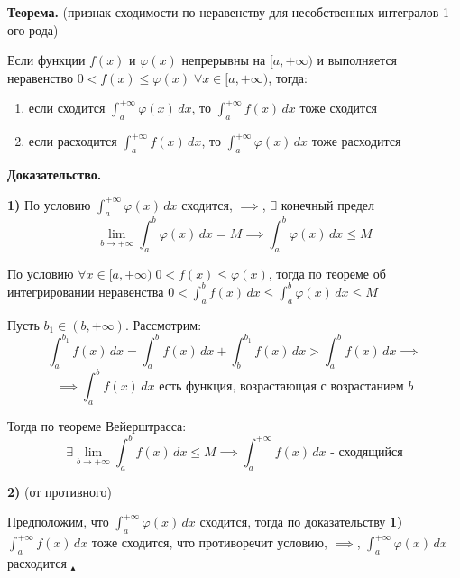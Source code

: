 \documentclass[11pt]{article}
\begin{document}
\par\textbf{Теорема.} (признак сходимости по неравенству для несобственных интегралов 1-ого рода)
\par Если функции $f(x)$ и $\varphi(x)$ непрерывны на $[a, +\infty)$ и выполняется неравенство $0 < f(x) \leq \varphi(x) \; \forall x \in [a, +\infty)$, тогда:
\begin{enumerate}
\item если сходится $\int_{a}^{+\infty} \varphi(x) \, dx$, то $\int_{a}^{+\infty} f(x) \, dx$ тоже сходится
\item если расходится $\int_{a}^{+\infty} f(x) \, dx$, то $\int_{a}^{+\infty} \varphi(x) \, dx$ тоже расходится
\end{enumerate}
\par\textbf{Доказательство.}
\par\textbf{1)} По условию $\int_{a}^{+\infty} \varphi(x) \, dx$ сходится, $\implies$, $\exists$ конечный предел $$\lim_{b \to +\infty}{\int_{a}^b \varphi(x) \, dx } = M \implies \int_{a}^{b} \varphi(x) \, dx \leq M$$
\par По условию $\forall x \in [a, +\infty) \; 0 < f(x) \leq \varphi(x)$, тогда по теореме об интегрировании неравенства  $0 < \int_{a}^b f(x) \, dx \leq \int_{a}^{b} \varphi(x) \, dx \leq M$
\par Пусть $b_{1} \in (b, +\infty)$. Рассмотрим:
$$\int_{a}^{b_{1}} f(x) \, dx = \int_{a}^{b} f(x) \, dx + \int_{b}^{b_{1}} f(x) \, dx > \int_{a}^{b} f(x) \, dx \implies$$
$$\implies \int_{a}^{b} f(x) \, dx \text{ есть функция, возрастающая с возрастанием } b$$
\par Тогда по теореме Вейерштрасса: $$\exists \lim_{ b \to +\infty } \int_{a}^{b} f(x) \, dx \leq M \implies \int_{a}^{+\infty} f(x) \, dx \text{ - сходящийся}$$
\par\textbf{2)} (от противного)
\par Предположим, что $\int_{a}^{+\infty} \varphi(x) \, dx$ сходится, тогда по доказательству \textbf{1)} $\int_{a}^{+\infty} f(x) \, dx$ тоже сходится, что противоречит условию, $\implies$, $\int_{a}^{+\infty} \varphi(x) \, dx$ расходится $_\blacktriangle$
\end{document}
